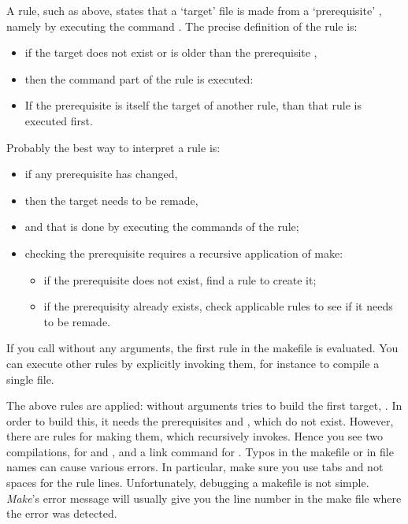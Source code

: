 A rule, such as above, states that a `target' file  is made
from a `prerequisite' , namely by executing the command . The precise definition of the rule is:
\begin{itemize}
\item if the target  does not exist or is older than the
  prerequisite ,
\item then the command part of the rule is executed: 
\item If the prerequisite is itself the target of another rule, than that
  rule is executed first.
\end{itemize}
Probably the best way to interpret a rule is:
\begin{itemize}
\item if any prerequisite has changed,
\item then the target needs to be remade,
\item and that is done by executing the commands of the rule;
\item checking the prerequisite requires a recursive application of
  make:
  \begin{itemize}
  \item if the prerequisite does not exist, find a rule to create it;
  \item if the prerequisity already exists, check applicable rules to
    see if it needs to be remade.
  \end{itemize}
\end{itemize}

If you call  without any arguments,
the first rule in the makefile is evaluated. You can execute other
rules by explicitly invoking them, for instance  to
compile a single file.

  {The above rules are applied:  without arguments tries to
    build the first target, . In order to build this, it
    needs the prerequisites  and , which do not
    exist. However, there are rules for making them, which 
    recursively invokes. Hence you see two compilations, for 
    and , and a link command for .}
  {Typos in the makefile or in file names can cause various
    errors. In particular, make sure you use tabs and not spaces for
    the rule lines. Unfortunately, debugging a makefile is not simple. 
    \emph{Make}'s error message will usually give 
    you the line number in the make file where the error was detected.}


